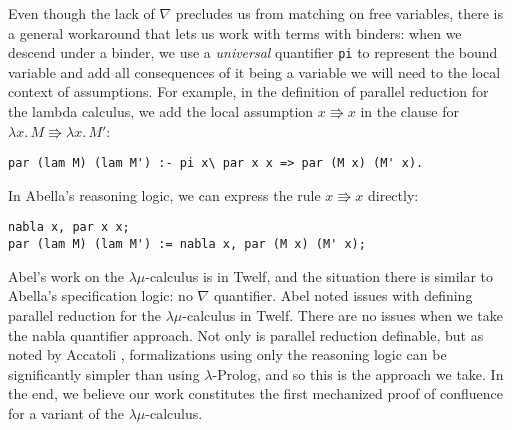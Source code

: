 \documentclass[a4paper, 11pt,titlepage, openright, twoside]{report}
\newcommand{\+}{\enspace}
\begin{document}
Even though the lack of $\nabla$ precludes us from matching on free variables,
there is a general workaround that lets us work with terms with binders:
when we descend under a binder,
we use a \textit{universal} quantifier \lstinline{pi} to represent the bound variable
and add all consequences of it being a variable we will need to the local context of assumptions.
For example, in the definition of parallel reduction for the lambda calculus,
we add the local assumption $x \Rrightarrow x$ in the clause for $λx.\,M \Rrightarrow λx.\,M'$:
\begin{lstlisting}
par (lam M) (lam M') :- pi x\ par x x => par (M x) (M' x).
\end{lstlisting}
In Abella's reasoning logic, we can express the rule $x \Rrightarrow x$ directly:
\begin{lstlisting}
nabla x, par x x;
par (lam M) (lam M') := nabla x, par (M x) (M' x);
\end{lstlisting}

Abel's work on the $λμ$-calculus is in Twelf, and the situation there
is similar to Abella's specification logic: no $\nabla$ quantifier.
Abel noted issues with defining parallel reduction for the $λμ$-calculus in Twelf.
There are no issues when we take the nabla quantifier approach.
Not only is parallel reduction definable,
but as noted by Accatoli \cite{pearl},
formalizations using only the reasoning logic
can be significantly simpler than using $λ$-Prolog,
and so this is the approach we take.
In the end, we believe our work constitutes the first mechanized proof of confluence for a variant of the $λμ$-calculus.
\end{document}
